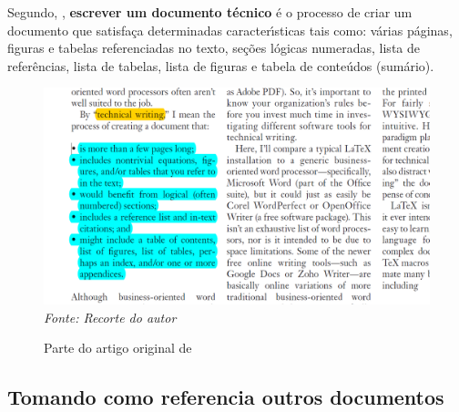 Segundo, \cite{Wright2010}, \textbf{escrever um documento t\'{e}cnico} \'{e} o processo de criar um documento que satisfa\c{c}a determinadas caracter\'{\i}sticas tais como: v\'{a}rias p\'{a}ginas, figuras e tabelas referenciadas no texto, se\c{c}\~{o}es l\'{o}gicas numeradas, lista de refer\^{e}ncias, lista de tabelas, lista de figuras e tabela de conte\'{u}dos (sum\'{a}rio).
\begin{figure}[H]
  \centering
  \caption{Parte do artigo original de \cite{Wright2010}}
  \includegraphics[width=12cm]{Escritatecnica.png}\\
  \textit{\small Fonte: Recorte do autor}
\end{figure}



\subsection{Tomando como referencia outros documentos}

